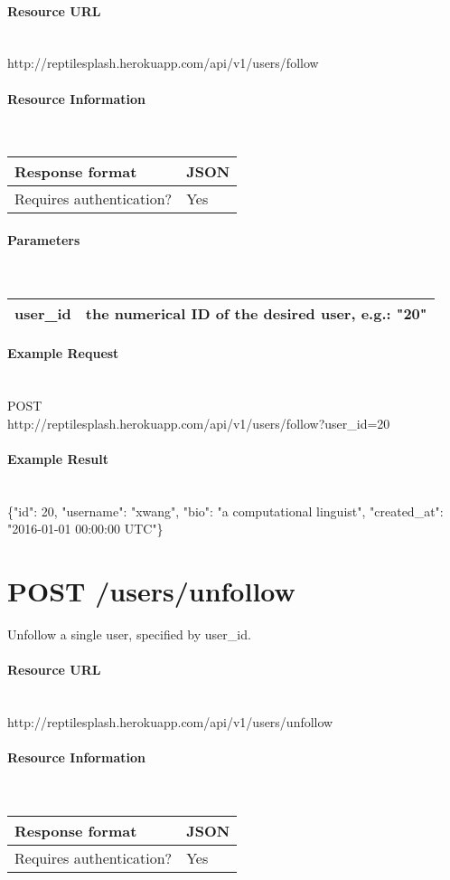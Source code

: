 \documentclass{article}
\begin{document}
	\paragraph{Resource URL} \mbox{} \\
	http://reptilesplash.herokuapp.com/api/v1/users/follow
	\paragraph{Resource Information} \mbox{} \\
	\begin{tabular}{ll}
		\hline
		Response format & JSON \\ \hline
		Requires authentication? & Yes \\ \hline
	\end{tabular}
	\paragraph{Parameters} \mbox{} \\
	\begin{tabular}{ll}
		\hline
		user\_id & the numerical ID of the desired user, e.g.: "20" \\ \hline
	\end{tabular}
	\paragraph{Example Request} \mbox{} \\
	POST \\
	http://reptilesplash.herokuapp.com/api/v1/users/follow?user\_id=20
	\paragraph{Example Result} \mbox{} \\
	\{"id": 20, "username": "xwang", "bio": "a computational linguist", "created\_at": "2016-01-01 00:00:00 UTC"\}
	
	
	\section*{POST /users/unfollow}
	Unfollow a single user, specified by user\_id.
	\paragraph{Resource URL} \mbox{} \\
	http://reptilesplash.herokuapp.com/api/v1/users/unfollow
	\paragraph{Resource Information} \mbox{} \\
	\begin{tabular}{ll}
		\hline
		Response format & JSON \\ \hline
		Requires authentication? & Yes \\ \hline
	\end{tabular}
\end{document}
